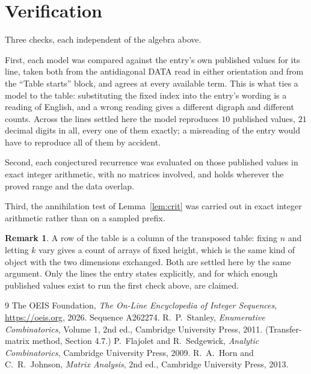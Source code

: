 \documentclass[11pt,a4paper]{article}
\theoremstyle{plain}
\theoremstyle{definition}
\newtheorem{remark}[theorem]{Remark}
\begin{document}
\section{Verification}

Three checks, each independent of the algebra above.

First, each model was compared against the entry's own published values for its line, taken
both from the antidiagonal DATA read in either orientation and from the ``Table starts''
block, and agrees at every available term. This is what ties a model to the table:
substituting the fixed index into the entry's wording is a reading of English, and a wrong
reading gives a different digraph and different counts. Across the lines settled here the
model reproduces $10$ published values, $21$ decimal digits in all, every one of
them exactly; a misreading of the entry would have to reproduce all of them by accident.

Second, each conjectured recurrence was evaluated on those published values in exact
integer arithmetic, with no matrices involved, and holds wherever the proved range and the
data overlap.

Third, the annihilation test of Lemma~\ref{lem:crit} was carried out in exact integer
arithmetic rather than on a sampled prefix.

\begin{remark}
A row of the table is a column of the transposed table: fixing $n$ and letting $k$ vary gives a
count of arrays of fixed height, which is the same kind of object with the two dimensions
exchanged. Both are settled here by the same argument. Only the lines the entry states
explicitly, and for which enough published values exist to run the first check above, are
claimed.
\end{remark}

\begin{thebibliography}{9}
 The OEIS Foundation, \emph{The On-Line Encyclopedia of Integer
Sequences}, \url{https://oeis.org}, 2026. Sequence A262274.
 R.~P.~Stanley, \emph{Enumerative Combinatorics}, Volume 1, 2nd ed.,
Cambridge University Press, 2011. (Transfer-matrix method, Section 4.7.)
 P.~Flajolet and R.~Sedgewick, \emph{Analytic Combinatorics}, Cambridge
University Press, 2009.
 R.~A.~Horn and C.~R.~Johnson, \emph{Matrix Analysis}, 2nd ed., Cambridge
University Press, 2013.
\end{thebibliography}
\end{document}
